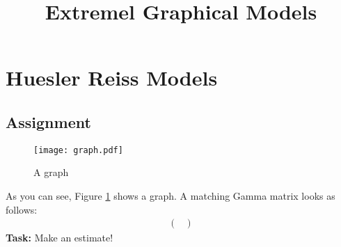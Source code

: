 \documentclass[a4paper, 12pt]{article}
\begin{document}
\newif\ifsolution
\solutionfalse

\setcounter{MaxMatrixCols}{20}

\title{Extremel Graphical Models}
\author{}

\maketitle

\section{Huesler Reiss Models}

\subsection{Assignment}

\begin{figure}[H]
    \centering
    \texttt{[image: graph.pdf]}
    \caption{
        A graph
    }
    \label{fig:graph}
\end{figure}
As you can see, Figure \ref{fig:graph} shows a graph.
A matching Gamma matrix looks as follows:
\begin{align}
    \left(
        \begin{matrix}
            
        \end{matrix}
    \right)
\end{align}
\textbf{Task:}
Make an estimate!

\ifsolution

\subsection{Solution}

The estimate is shown in Figure \ref{fig:estimate}.

\begin{figure}[H]
    \centering
    \texttt{[image: estimate.pdf]}
    \caption{
        An estimate
    }
    \label{fig:estimate}
\end{figure}

\fi
\end{document}
